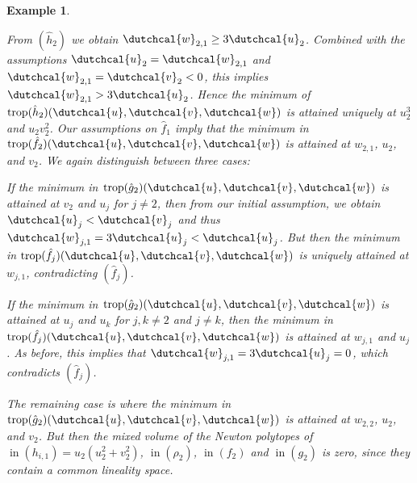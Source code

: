 \documentclass[12pt,reqno,a4paper]{amsart}
\newcommand{\dcu}{\dutchcal{u}}
\newcommand{\dcv}{\dutchcal{v}}
\newcommand{\dcw}{\dutchcal{w}}
\theoremstyle{theoremstyle}
\theoremstyle{examplestyle}
\newtheorem{example}[theorem]{Example}
\theoremstyle{algorithmstyle}
\DeclareMathOperator{\initial}{in}
\DeclareMathOperator{\trop}{trop}
\begin{document}
\begin{example}
\begin{description}[leftmargin=5mm]
\begin{description}[leftmargin=3mm]
    \item[$\dcu_2=\dcv_2=\dcw_{2,1}=\dcw_{2,2}$] From $(\hat h_2)$ we obtain $\dcw_{2,1}\geq 3\dcu_2$. Combined with the assumptions $\dcu_2=\dcw_{2,1}$ and $\dcw_{2,1}=\dcv_2<0$, this implies $\dcw_{2,1}>3\dcu_2$. Hence the minimum of $\trop(\hat h_2)(\dutchcal{u},\dutchcal{v},\dutchcal{w})$ is attained uniquely at $u_2^3$ and $u_2v_2^2$. Our assumptions on $\hat f_1$ imply that the minimum in $\trop(\hat f_2)(\dcu,\dcv,\dcw)$ is attained at $w_{2,1}$, $u_2$, and $v_2$. We again distinguish between three cases:

    If the minimum in $\trop(\hat{g}_{2})(\dcu,\dcv,\dcw)$ is attained at $v_2$ and $u_{j}$ for $j\neq{2}$, then from our initial assumption, we obtain $\dcu_{j}<\dcv_{j}$ and thus $\dcw_{j,1}=3\dcu_{j}<\dcu_{j}$. But then the minimum in $\trop(\hat f_j)(\dcu,\dcv,\dcw)$ is uniquely attained at $w_{j,1}$, contradicting $(\hat f_j)$.

    If the minimum in $\trop(\hat{g}_{2})(\dcu,\dcv,\dcw)$ is attained at $u_{j}$ and $u_{k}$ for $j,k\neq{2}$ and $j\neq k$, then the minimum in $\trop(\hat f_j)(\dcu,\dcv,\dcw)$ is attained at $w_{j,1}$ and $u_{j}$. As before, this implies that $\dcw_{j,1}=3\dcu_{j}=0$, which contradicts $(\hat f_j)$.

    The remaining case is where the minimum in $\trop(\hat{g}_{2})(\dcu,\dcv,\dcw)$ is attained at $w_{2,2}$, $u_2$, and $v_2$. But then the mixed volume of the Newton polytopes of  $\initial(h_{i,1})=u_{2}(u_{2}^2+v_{2}^2)$, $\initial(\rho_{2})$, $\initial(f_{2})$ and  $\initial(g_{2})$ is zero, since they contain a common lineality space.
 \end{description}
 \end{description}
\end{example}
 
\renewcommand*{\bibfont}{\small}
\printbibliography
\end{document}
